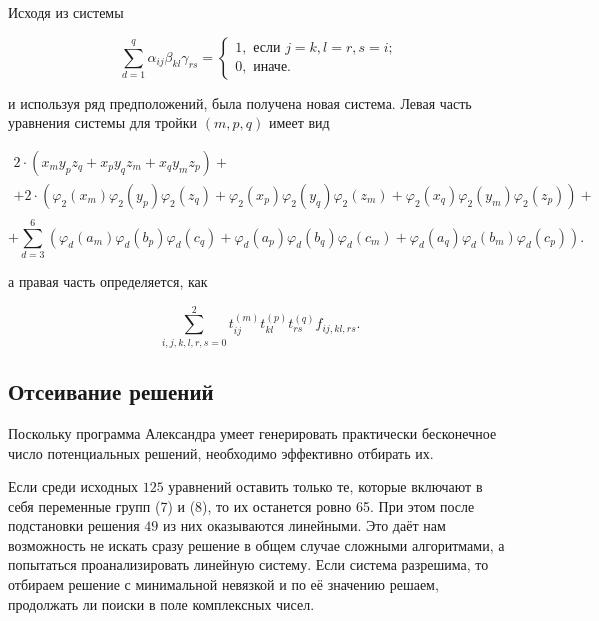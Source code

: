 \documentclass[12pt]{article}
\begin{document}
    Исходя из системы

    \begin{equation}
        \sum_{d=1}^{q} \alpha_{ij} \beta_{kl} \gamma_{rs} =
        \begin{cases}
            1,\text{ если } j = k, l = r, s = i;\\
            0, \text{ иначе.}
        \end{cases}\label{eq:2}
    \end{equation}

    и используя ряд предположений, была получена новая система.
    Левая часть уравнения системы для тройки $(m, p, q)$ имеет вид

    \begin{gather*}
        2\cdot (x_{m} y_{p} z_{q}+x_{p} y_{q} z_{m}+x_{q} y_{m} z_{p}) +\\
        +2 \cdot (\varphi_2 (x_m) \varphi_2 (y_p) \varphi_2 (z_q)+ \varphi_2 (x_p) \varphi_2 (y_q) \varphi_2 (z_m)+ \varphi_2 (x_q) \varphi_2 (y_m) \varphi_2 (z_p))+\\
    \end{gather*}
    \begin{equation}
        +\sum_{d=3}^{6} (\varphi_d (a_m) \varphi_d (b_p) \varphi_d (c_q)+ \varphi_d (a_p) \varphi_d (b_q) \varphi_d (c_m) + \varphi_d (a_q) \varphi_d (b_m) \varphi_d (c_p)).\label{eq:3}
    \end{equation}

    а правая часть определяется, как

    \begin{equation}
        \sum_{i,j,k,l,r,s=0}^2 t_{ij}^{(m)} t_{kl}^{(p)} t_{rs}^{(q)} f_{ij,kl,rs}.\label{eq:4}
    \end{equation}

    \subsection{Отсеивание решений}

    Поскольку программа Александра умеет генерировать практически бесконечное число потенциальных решений, необходимо
    эффективно отбирать их.

    Если среди исходных $ 125 $ уравнений оставить только те, которые включают в себя переменные групп (7) и (8), то их
    останется ровно 65.
    При этом после подстановки решения $ 49 $ из них оказываются линейными.
    Это даёт нам возможность не искать сразу решение в общем случае сложными алгоритмами, а попытаться проанализировать
    линейную систему.
    Если система разрешима, то отбираем решение с минимальной невязкой и по её значению решаем, продолжать ли поиски в
    поле комплексных чисел.
\end{document}
